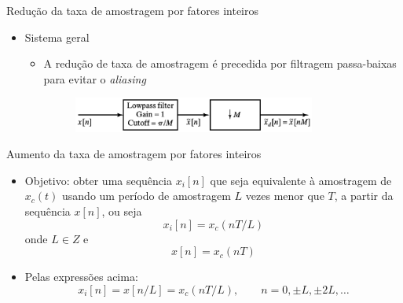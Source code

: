 \documentclass[
size=11pt,
paper=screen,
mode=present,
display=slidesnotes,
style=paintings,
nopagebreaks,
blackslide,
fleqn]{powerdot}
\begin{document}
\begin{slide}{Redução da taxa de amostragem por fatores inteiros}
	\begin{itemize}
		\item Sistema geral
			\begin{itemize}
				\item A redução de taxa de amostragem é precedida por filtragem passa-baixas para evitar o \emph{aliasing}
				\begin{figure}
					\centering
					\includegraphics[width=0.8\textwidth]{figs/4-22.eps}
		        	\end{figure}
			\end{itemize}
	\end{itemize}
\end{slide}

\begin{slide}{Aumento da taxa de amostragem por fatores inteiros}
	\begin{itemize}
		\item Objetivo: obter uma sequência $x_i[n]$ que seja equivalente à amostragem de $x_c(t)$ usando um período de amostragem $L$ vezes menor que $T$, a partir da sequência $x[n]$, ou seja 
			\begin{equation*}
				x_i[n] = x_c(nT/L)
			\end{equation*}
			onde $L \in Z$ e 
			\begin{equation*}
				x[n] = x_c(nT)
			\end{equation*}
		\item Pelas expressões acima:
			\begin{equation*}
				x_i[n] = x[n/L] = x_c(nT/L), \qquad n= 0, \pm L, \pm 2L, \dots
			\end{equation*}
	\end{itemize}
\end{slide}
\end{document}
